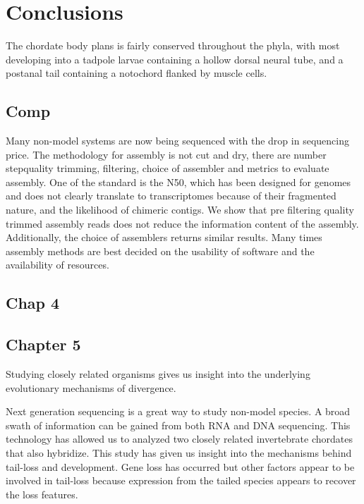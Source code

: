 \chapter{Conclusions}
The chordate body plans is fairly conserved throughout the phyla, with most developing into a tadpole larvae containing a hollow dorsal neural tube, and a postanal tail containing a notochord flanked by muscle cells. 
\section{Comp}
Many non-model systems are now being sequenced with the drop in sequencing price. The methodology for assembly is not cut and dry, there are number step\textemdash quality trimming, filtering, choice of assembler and metrics to evaluate assembly. One of the standard is the N50, which has been designed for genomes and does not clearly translate to transcriptomes because of their fragmented nature, and the likelihood of chimeric contigs. We show that pre filtering quality trimmed assembly reads does not reduce the information content of the assembly. Additionally, the choice of assemblers returns similar results. Many times assembly methods are best decided on the usability of software and the availability of resources.

\section{Chap 4}



\section{Chapter 5}
Studying closely related organisms gives us insight into the underlying evolutionary mechanisms of divergence. 

Next generation sequencing is a great way to study non-model species. A broad swath of information can be gained from both RNA and DNA sequencing. This technology has allowed us to analyzed two closely related invertebrate chordates that also hybridize. This study has given us insight into the mechanisms behind tail-loss and development. Gene loss has occurred but other factors appear to be involved in tail-loss because expression from the tailed species appears to recover the loss features. 
